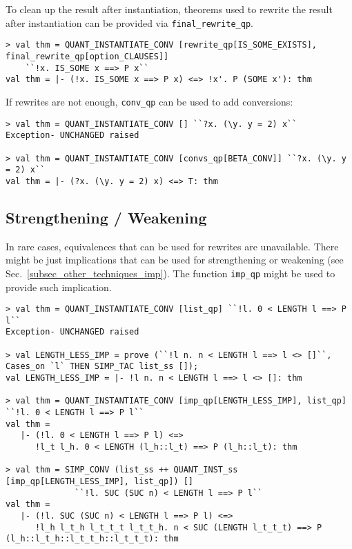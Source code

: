 \documentclass[a4paper,12pt,DIV=12,oneside]{scrbook}
\theoremstyle{definition}
\theoremstyle{remark}
\begin{document}
To clean up the result after instantiation, theorems used to rewrite the result after instantiation can be provided via
\texttt{final\_rewrite\_qp}.

{\scriptsize
\begin{verbatim}
> val thm = QUANT_INSTANTIATE_CONV [rewrite_qp[IS_SOME_EXISTS], final_rewrite_qp[option_CLAUSES]]
    ``!x. IS_SOME x ==> P x``
val thm = |- (!x. IS_SOME x ==> P x) <=> !x'. P (SOME x'): thm
\end{verbatim}}

If rewrites are not enough, \texttt{conv\_qp} can be used to add conversions:

{\scriptsize
\begin{verbatim}
> val thm = QUANT_INSTANTIATE_CONV [] ``?x. (\y. y = 2) x``
Exception- UNCHANGED raised

> val thm = QUANT_INSTANTIATE_CONV [convs_qp[BETA_CONV]] ``?x. (\y. y = 2) x``
val thm = |- (?x. (\y. y = 2) x) <=> T: thm
\end{verbatim}}

\subsection{Strengthening / Weakening}

In rare cases, equivalences that can be used for rewrites are unavailable. There might be just implications that
can be used for strengthening or weakening (see Sec.~\ref{subsec_other_techniques_imp}). The function
\texttt{imp\_qp} might be used to provide such implication.

{\scriptsize
\begin{verbatim}
> val thm = QUANT_INSTANTIATE_CONV [list_qp] ``!l. 0 < LENGTH l ==> P l``
Exception- UNCHANGED raised

> val LENGTH_LESS_IMP = prove (``!l n. n < LENGTH l ==> l <> []``, Cases_on `l` THEN SIMP_TAC list_ss []);
val LENGTH_LESS_IMP = |- !l n. n < LENGTH l ==> l <> []: thm

> val thm = QUANT_INSTANTIATE_CONV [imp_qp[LENGTH_LESS_IMP], list_qp] ``!l. 0 < LENGTH l ==> P l``
val thm =
   |- (!l. 0 < LENGTH l ==> P l) <=>
      !l_t l_h. 0 < LENGTH (l_h::l_t) ==> P (l_h::l_t): thm

> val thm = SIMP_CONV (list_ss ++ QUANT_INST_ss [imp_qp[LENGTH_LESS_IMP], list_qp]) []
              ``!l. SUC (SUC n) < LENGTH l ==> P l``
val thm =
   |- (!l. SUC (SUC n) < LENGTH l ==> P l) <=>
      !l_h l_t_h l_t_t_t l_t_t_h. n < SUC (LENGTH l_t_t_t) ==> P (l_h::l_t_h::l_t_t_h::l_t_t_t): thm
\end{verbatim}}
\end{document}
